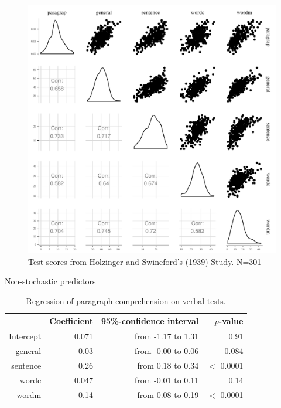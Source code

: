 \documentclass[11pt,a4paper,twoside]{book}\usepackage[]{graphicx}\usepackage[]{color}
\makeatletter
\def\maxwidth{ %
  \ifdim\Gin@nat@width>\linewidth
    \linewidth
  \else
    \Gin@nat@width
  \fi
}
\makeatother
\begin{document}
\begin{figure}
\includegraphics[width=\maxwidth]{figure/ch03_figunnamed-chunk-1-1} \caption[Test scores from Holzinger and Swineford's  (1939) Study]{Test scores from Holzinger and Swineford's  (1939) Study. N=301}\label{fig:unnamed-chunk-1}
\end{figure}



Non-stochastic predictors 



\begin{table}[!h]
\centering
\caption{Regression of paragraph comprehension on verbal tests.} 
\label{tbl:empirical.reg}
\begingroup\footnotesize
\begin{tabular}{rrrr}
  \hline
 & Coefficient & 95\%-confidence interval & $p$-value \\ 
  \hline
Intercept & 0.071 & from -1.17 to 1.31 & 0.91 \\ 
  general & 0.03 & from -0.00 to 0.06 & 0.084 \\ 
  sentence & 0.26 & from 0.18 to 0.34 & $<$ 0.0001 \\ 
  wordc & 0.047 & from -0.01 to 0.11 & 0.14 \\ 
  wordm & 0.14 & from 0.08 to 0.19 & $<$ 0.0001 \\ 
   \hline
\end{tabular}
\endgroup
\end{table}
\end{document}
